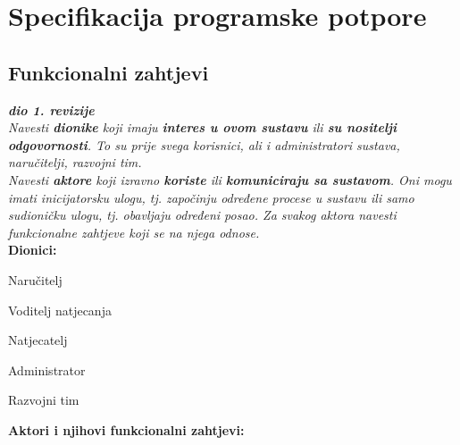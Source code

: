 \chapter{Specifikacija programske potpore}
		
		
\section{Funkcionalni zahtjevi}

\textbf{\textit{dio 1. revizije}}\\

\textit{Navesti \textbf{dionike} koji imaju \textbf{interes u ovom sustavu} ili  \textbf{su nositelji odgovornosti}. To su prije svega korisnici, ali i administratori sustava, naručitelji, razvojni tim.}\\

\textit{Navesti \textbf{aktore} koji izravno \textbf{koriste} ili \textbf{komuniciraju sa sustavom}. Oni mogu imati inicijatorsku ulogu, tj. započinju određene procese u sustavu ili samo sudioničku ulogu, tj. obavljaju određeni posao. Za svakog aktora navesti funkcionalne zahtjeve koji se na njega odnose.}\\


\noindent \textbf{Dionici:}

\begin{packed_enum}
	\item Naručitelj
	\item Voditelj natjecanja
	\item Natjecatelj				
	\item Administrator
	\item Razvojni tim
	
\end{packed_enum}

\noindent \textbf{Aktori i njihovi funkcionalni zahtjevi:}


